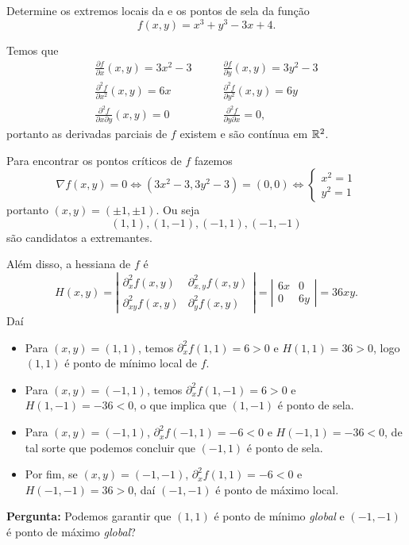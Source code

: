 \begin{example}
    Determine os extremos locais da e os pontos de sela da função \[f(x,y) = x^3 + y^3 - 3x + 4.\]

    Temos que
        \begin{align*}
            \frac{\partial f}{\partial x}(x,y) = 3x^2 - 3 \quad & \quad \frac{\partial f}{\partial y}(x,y) = 3y^2 - 3 \\
            \frac{\partial^2 f}{\partial x^2}(x,y) = 6x \quad & \quad \frac{\partial^2 f}{\partial y^2}(x,y) = 6y \\
            \frac{\partial^2 f}{\partial x \partial y}(x,y) = 0 \quad & \quad  \frac{\partial^2 f}{\partial y \partial x} = 0,
        \end{align*}
    portanto as derivadas parciais de \(f\) existem e são contínua em \(\mathbb{R}^2\).

    Para encontrar os pontos críticos de \(f\) fazemos \[\nabla f(x,y) = 0 \Leftrightarrow (3x^2 - 3,3y^2 - 3) = (0,0) \Leftrightarrow \begin{cases}
        x^2 = 1 \\
        y^2 = 1 
    \end{cases}\] portanto \((x,y) = (\pm 1, \pm 1).\) Ou seja \[(1,1), (1,-1), (-1,1), (-1,-1)\] são candidatos a extremantes. 

    Além disso, a hessiana de \(f\) é \[H(x,y) = \left|\begin{matrix}
        \partial^2_x f(x,y) & \partial^2_{x,y} f(x,y) \\
        \partial^2_{xy} f(x,y) & \partial^2_y f(x,y)
    \end{matrix}\right| = \left|\begin{matrix}
        6x & 0 \\ 0 & 6y
    \end{matrix}\right| = 36 xy.\] Daí
        \begin{itemize}
            \item Para \((x,y) = (1,1)\), temos \(\partial^2_x f(1,1) = 6 > 0\) e \(H(1,1) = 36 > 0\), logo \((1,1)\) é ponto de mínimo local de \(f\).
            \item Para \((x,y) = (-1,1)\), temos \(\partial^2_x f(1,-1) = 6 > 0\) e \(H(1,-1) = - 36 < 0\), o que implica que \((1,-1)\) é ponto de sela.
            \item Para \((x,y) = (-1,1)\), \(\partial^2_x f(-1,1) = -6 < 0\) e \(H(-1,1) = -36 < 0\), de tal sorte que podemos concluir que \((-1,1)\) é ponto de sela.
            \item Por fim, se \((x,y) = (-1,-1)\), \(\partial^2_x f(1,1) = -6<0\) e \(H(-1,-1) = 36 >0\), daí \((-1,-1)\) é ponto de máximo local.
        \end{itemize}

    \textbf{Pergunta: } Podemos garantir que \((1,1)\) é ponto de mínimo \textit{global} e \((-1,-1)\) é ponto de máximo \textit{global}?
\end{example}

